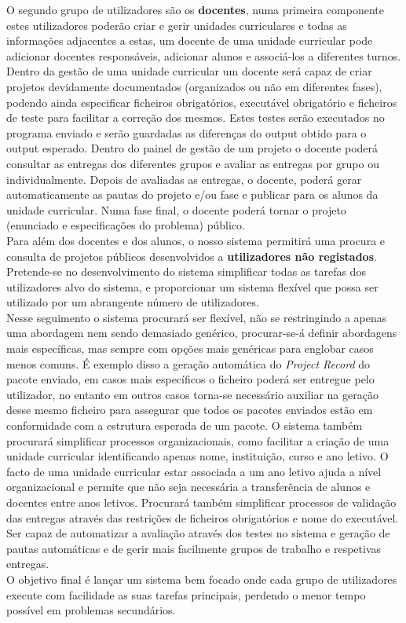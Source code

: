 O segundo grupo de utilizadores são os \textbf{docentes}, numa primeira componente estes utilizadores poderão criar e gerir unidades curriculares e todas as informações adjacentes a estas, um docente de uma unidade curricular pode adicionar docentes responsáveis, adicionar alunos e associá­-los a diferentes turnos. Dentro da gestão de uma unidade curricular um docente será capaz de criar projetos devidamente documentados (organizados ou não em diferentes fases), podendo ainda especificar ficheiros obrigatórios, executável obrigatório e ficheiros de teste para facilitar a correção dos mesmos. Estes testes serão executados no programa enviado e serão guardadas as diferenças do output obtido para o output esperado. Dentro do painel de gestão de um projeto o docente poderá consultar as entregas dos diferentes grupos e avaliar as entregas por grupo ou individualmente. Depois de avaliadas as entregas, o docente, poderá gerar automaticamente as pautas do projeto e/ou fase e publicar para os alunos da unidade curricular.
Numa fase final, o docente poderá tornar o projeto (enunciado e especificações do problema) público.\\

Para além dos docentes e dos alunos, o nosso sistema permitirá uma procura e consulta de projetos públicos desenvolvidos a \textbf{utilizadores não registados}.\\

Pretende-se no desenvolvimento do sistema simplificar todas as tarefas dos utilizadores alvo do sistema, e proporcionar um sistema flexível que possa ser utilizado por um abrangente número de utilizadores.\\

Nesse seguimento o sistema procurará ser flexível, não se restringindo a apenas uma abordagem nem sendo demasiado genérico, procurar-se-á definir abordagens mais específicas, mas sempre com opções mais genéricas para englobar casos menos comuns. É exemplo disso a geração automática do \textit{Project Record} do pacote enviado, em casos mais específicos o ficheiro poderá ser entregue pelo utilizador, no entanto em outros casos torna-se necessário auxiliar na geração desse mesmo ficheiro para assegurar que todos os pacotes enviados estão em conformidade com a estrutura esperada de um pacote. O sistema também procurará simplificar processos organizacionais, como facilitar a criação de uma unidade curricular identificando apenas nome, instituição, curso e ano letivo. O facto de uma unidade curricular estar associada a um ano letivo ajuda a nível organizacional e permite que não seja necessária a transferência de alunos e docentes entre anos letivos. Procurará também simplificar processos de validação das entregas através das restrições de ficheiros obrigatórios e nome do executável. Ser capaz de automatizar a avaliação através dos testes no sistema e geração de pautas automáticas e de gerir mais facilmente grupos de trabalho e respetivas entregas.\\

O objetivo final é lançar um sistema bem focado onde cada grupo de utilizadores execute com facilidade as suas tarefas principais, perdendo o menor tempo possível em problemas secundários. 
